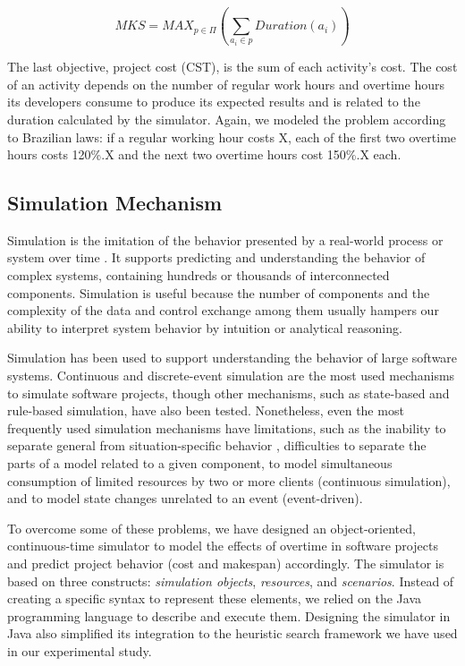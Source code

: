 \documentclass[conference]{IEEEtran}
\begin{document}
\setlength\abovedisplayshortskip{0pt}
\setlength\belowdisplayshortskip{0pt}
\begin{small}
\begin{equation}
MKS = MAX_{p\in\Pi} (\sum_{a_{i} \in p} Duration (a_{i}))
\end{equation}
\end{small}

The last objective, project cost (CST), is the sum of each activity's cost. The cost of an activity depends on the number of regular work hours and overtime hours its developers consume to produce its expected results and is related to the duration calculated by the simulator. Again, we modeled the problem according to Brazilian laws: if a regular working hour costs X, each of the first two overtime hours costs 120\%.X and the next two overtime hours cost 150\%.X each.


\subsection{Simulation Mechanism}
Simulation is the imitation of the behavior presented by a real-world process or system over time \cite{Banks:2000}. It supports predicting and understanding the behavior of complex systems, containing hundreds or thousands of interconnected components. Simulation is useful because the number of components and the complexity of the data and control exchange among them usually hampers our ability to interpret system behavior by intuition or analytical reasoning.

Simulation has been used to support understanding the behavior of large software systems. Continuous \cite{Forrester:1961} and discrete-event \cite{Ross:1990} simulation are the most used mechanisms to simulate software projects, though other mechanisms, such as state-based \cite{harel:1990} and rule-based \cite{Drappa:1999} simulation, have also been tested. Nonetheless, even the most frequently used simulation mechanisms have limitations, such as the inability to separate general from situation-specific behavior \cite{Barros:2002}, difficulties to separate the parts of a model related to a given component, to model simultaneous consumption of limited resources by two or more clients (continuous simulation), and to model state changes unrelated to an event (event-driven).

To overcome some of these problems, we have designed an object-oriented, continuous-time simulator to model the effects of overtime in software projects and predict project behavior (cost and makespan) accordingly. The simulator is based on three constructs: {\it simulation objects}, {\it resources}, and {\it scenarios}. Instead of creating a specific syntax to represent these elements, we relied on the Java programming language to describe and execute them. Designing the simulator in Java also simplified its integration to the heuristic search framework we have used in our experimental study.
\end{document}
